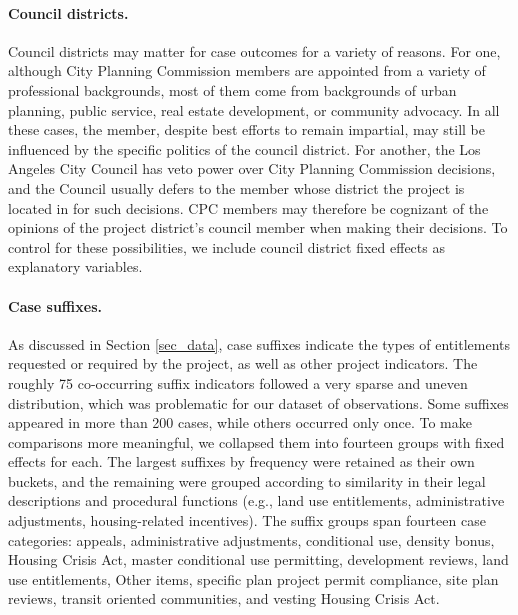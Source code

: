 \paragraph{Council districts.} Council districts may matter for case outcomes for a variety of reasons. For one, although City Planning Commission members are appointed from a variety of professional backgrounds, most of them come from backgrounds of urban planning, public service, real estate development, or community advocacy. In all these cases, the member, despite best efforts to remain impartial, may still be influenced by the specific politics of the council district. For another, the Los Angeles City Council has veto power over City Planning Commission decisions, and the Council usually defers to the member whose district the project is located in for such decisions. CPC members may therefore be cognizant of the opinions of the project district's council member when making their decisions. To control for these possibilities, we include council district fixed effects as explanatory variables.

\paragraph{Case suffixes.} As discussed in Section \ref{sec_data}, case suffixes indicate the types of entitlements requested or required by the project, as well as other project indicators. The roughly 75 co-occurring suffix indicators followed a very sparse and uneven distribution, which was problematic for our dataset of  observations. Some suffixes appeared in more than 200 cases, while others occurred only once. To make comparisons more meaningful, we collapsed them into fourteen groups with fixed effects for each. The largest suffixes by frequency were retained as their own buckets, and the remaining were grouped according to similarity in their legal descriptions and procedural functions (e.g., land use entitlements, administrative adjustments, housing-related incentives). The suffix groups span fourteen case categories: appeals, administrative adjustments, conditional use, density bonus, Housing Crisis Act, master conditional use permitting, development reviews, land use entitlements, Other items, specific plan project permit compliance, site plan reviews, transit oriented communities, and vesting Housing Crisis Act.









